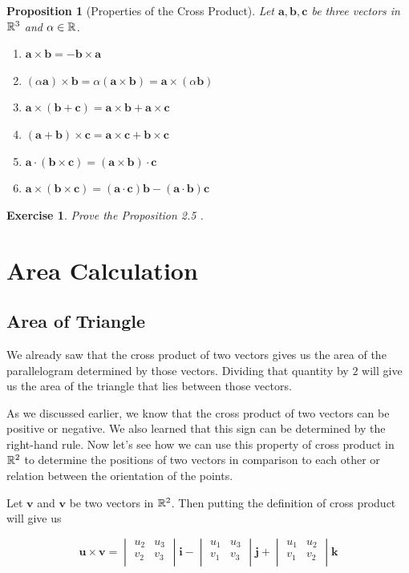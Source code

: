 \documentclass[12pt]{article}
\newtheorem{proposition}{Proposition}[section]
\newtheorem{exercise}{Exercise}[section]
\begin{document}
\begin{proposition}[Properties of the Cross Product]
  Let $\pmb{a}, \pmb{b}, \pmb{c}$ be three vectors in $\mathbb{R}^3$ and $\alpha \in \mathbb{R}$.
  \begin{enumerate}
    \item $\pmb{a} \times \pmb{b} = - \pmb{b} \times \pmb{a}$
    \item $(\alpha\pmb{a}) \times \pmb{b} = \alpha(\pmb{a} \times \pmb{b}) = \pmb{a} \times (\alpha \pmb{b})$
    \item $\pmb{a} \times (\pmb{b} + \pmb{c}) = \pmb{a} \times \pmb{b} + \pmb{a} \times \pmb{c}$
    \item $(\pmb{a} + \pmb{b}) \times \pmb{c} = \pmb{a} \times \pmb{c} + \pmb{b} \times \pmb{c}$
    \item $\pmb{a} \cdot (\pmb{b} \times \pmb{c}) = (\pmb{a} \times \pmb{b}) \cdot \pmb{c}$
    \item $\pmb{a} \times (\pmb{b} \times \pmb{c}) = (\pmb{a} \cdot \pmb{c})\pmb{b} - (\pmb{a} \cdot \pmb{b}) \pmb{c}$
  \end{enumerate}
\end{proposition}

\begin{exercise}
  Prove the Proposition 2.5 .
\end{exercise}

\section{Area Calculation}
\subsection{Area of Triangle}
We already saw that the cross product of two vectors gives us the area of the 
parallelogram determined by those vectors. Dividing that quantity by $2$ will give us the 
area of the triangle that lies between those vectors.

As we discussed earlier, we know that the cross product of two vectors can be positive or negative.
We also learned that this sign can be determined by the right-hand rule. 
Now let's see how we can use this property of cross product in $\mathbb{R}^2$ to determine the positions of two vectors in comparison to each other or relation between the orientation of the points.

Let $\pmb{v}$ and $\pmb{v}$ be two vectors in $\mathbb{R}^2$. Then putting the definition of cross product will give us

\[
\pmb{u} \times \pmb{v} =  
\begin{vmatrix}
  u_2 & u_3 \\
  v_2 & v_3 \\
\end{vmatrix} \pmb{i}
- \begin{vmatrix}
  u_1 & u_3 \\
  v_1 & v_3 \\
\end{vmatrix} \pmb{j}
+ \begin{vmatrix}
  u_1 & u_2 \\
  v_1 & v_2 \\
\end{vmatrix} \pmb{k}
\]
\end{document}
